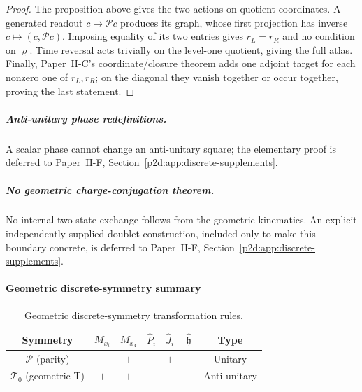 \documentclass[12pt,a4paper]{article}
\begin{document}
\begin{proof}
The proposition above gives the two actions on quotient coordinates.  A
generated readout \(c\mapsto\mathcal Pc\) produces its graph, whose first
projection has inverse \(c\mapsto(c,\mathcal Pc)\).  Imposing equality of its
two entries gives \(r_L=r_R\) and no condition on \(\varrho\).  Time reversal
acts trivially on the level-one quotient, giving the full atlas.  Finally,
Paper~II-C's coordinate/closure theorem adds one adjoint target for each
nonzero one of \(r_L,r_R\); on the diagonal they vanish together or occur
together, proving the last statement.
\end{proof}

\subparagraph{Anti-unitary phase redefinitions.}
A scalar phase cannot change an anti-unitary square; the elementary proof is
deferred to Paper~II-F, Section~\ref{p2d:app:discrete-supplements}.


\subparagraph{No geometric charge-conjugation theorem.}
No internal two-state exchange follows from the geometric kinematics.  An
explicit independently supplied doublet construction, included only to make
this boundary concrete, is deferred to
Paper~II-F, Section~\ref{p2d:app:discrete-supplements}.


\paragraph{Geometric discrete-symmetry summary}

\begin{table}[htbp]
\centering
\small
\begingroup
\renewcommand{\arraystretch}{1.3}
\begin{tabular}{|c|c|c|c|c|c|c|}
\hline
\textbf{Symmetry} & $M_{x_i}$ & $M_{x_4}$ & $\hat{P}_i$ & $\hat{J}_i$ & $\hat{\mathfrak h}$ & Type \\
\hline
$\mathcal{P}$ (parity) & $-$ & $+$ & $-$ & $+$ & --- & Unitary \\
\hline
$\mathcal{T}_0$ (geometric T) & $+$ & $+$ & $-$ & $-$ & $-$ & Anti-unitary \\
\hline
\end{tabular}
\caption[Geometric discrete-symmetry transformation rules]{Geometric discrete-symmetry transformation rules.}
\label{p2:tab:discrete-symmetries}
\endgroup
\end{table}
\end{document}
